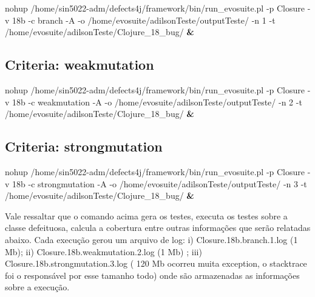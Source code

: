 \documentclass[11pt]{article}
\newenvironment{Shaded}{}{}
\newcommand{\KeywordTok}[1]{\textcolor[rgb]{0.00,0.44,0.13}{\textbf{{#1}}}}
\newcommand{\FunctionTok}[1]{\textcolor[rgb]{0.02,0.16,0.49}{{#1}}}
\newcommand{\NormalTok}[1]{{#1}}
\begin{document}
    \begin{Shaded}
\begin{Highlighting}[]
\FunctionTok{nohup}\NormalTok{ /home/sin5022-adm/defects4j/framework/bin/run_evosuite.pl -p Closure -v 18b -c branch -A -o /home/evosuite/adilsonTeste/outputTeste/ -n 1 -t /home/evosuite/adilsonTeste/Clojure_18_bug/ }\KeywordTok{&}
\end{Highlighting}
\end{Shaded}

    \hypertarget{criteria-weakmutation}{%
\subsection{Criteria: weakmutation}\label{criteria-weakmutation}}

    \begin{Shaded}
\begin{Highlighting}[]
\FunctionTok{nohup}\NormalTok{ /home/sin5022-adm/defects4j/framework/bin/run_evosuite.pl -p Closure -v 18b -c weakmutation -A -o /home/evosuite/adilsonTeste/outputTeste/ -n 2 -t /home/evosuite/adilsonTeste/Clojure_18_bug/ }\KeywordTok{&}
\end{Highlighting}
\end{Shaded}

    \hypertarget{criteria-strongmutation}{%
\subsection{Criteria: strongmutation}\label{criteria-strongmutation}}

    \begin{Shaded}
\begin{Highlighting}[]
\FunctionTok{nohup}\NormalTok{ /home/sin5022-adm/defects4j/framework/bin/run_evosuite.pl -p Closure -v 18b -c strongmutation -A -o /home/evosuite/adilsonTeste/outputTeste/ -n 3 -t /home/evosuite/adilsonTeste/Clojure_18_bug/ }\KeywordTok{&}
\end{Highlighting}
\end{Shaded}

    Vale ressaltar que o comando acima gera os testes, executa os testes
sobre a classe defeituosa, calcula a cobertura entre outras informações
que serão relatadas abaixo. Cada execução gerou um arquivo de log: i)
Closure.18b.branch.1.log (1 Mb); ii) Closure.18b.weakmutation.2.log (1
Mb) ; iii) Closure.18b.strongmutation.3.log ( 120 Mb ocorreu muita
exception, o stacktrace foi o responsável por esse tamanho todo) onde
são armazenadas as informações sobre a execução.
\end{document}
